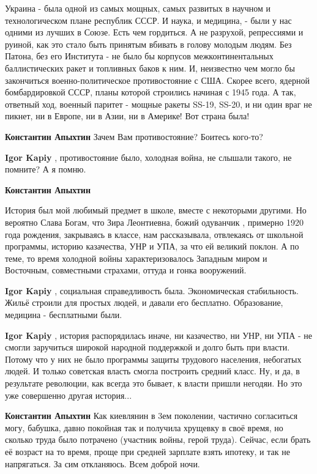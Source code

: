 \begin{itemize}
Украина - была одной из самых мощных, самых развитых в научном и
технологическом плане республик СССР. И наука, и медицина, - были у нас одними
из лучших в Союзе. Есть чем гордиться. А не разрухой, репрессиями и руиной, как
это стало быть принятым вбивать в голову молодым людям. Без Патона, без его
Института - не было бы корпусов межконтинентальных баллистических ракет и
топливных баков к ним. И, неизвестно чем могло бы закончиться
военно-политическое противостояние с США. Скорее всего, ядерной бомбардировкой
СССР, планы которой строились начиная с 1945 года. А так, ответный ход, военный
паритет - мощные ракеты SS-19, SS-20, и ни один враг не пикнет, ни в Европе, ни
в Азии, ни в Америке! Вот страна была!

\begin{itemize} %
\textbf{Константин Апыхтин} Зачем Вам противостояние? Боитесь кого-то?

\begin{itemize} %
\textbf{Igor Kapiy} , противостояние было, холодная война, не слышали такого, не помните? А я помню.

\textbf{Константин Апыхтин} 

История был мой любимый предмет в школе, вместе с некоторыми другими. Но
вероятно Слава Богам, что Зира Леонтиевна, божий одуванчик , примерно 1920 года
рождения, закрываясь в классе, нам рассказывала, отвлекаясь от школьной
программы, историю казачества, УНР и УПА, за что ей великий поклон. А по теме,
то время холодной войны характеризовалось Западным миром и Восточным,
совместными страхами, оттуда и гонка вооружений.

\textbf{Igor Kapiy} , социальная справедливость была. Экономическая стабильность. Жильё строили для простых людей, и давали его бесплатно. Образование, медицина - бесплатными были.

\textbf{Igor Kapiy} , история распорядилась иначе, ни казачество, ни УНР, ни УПА - не смогли заручиться широкой народной поддержкой и долго быть при власти. Потому что у них не было программы защиты трудового населения, небогатых людей. И только советская власть смогла построить средний класс. Ну, и да, в результате революции, как всегда это бывает, к власти пришли негодяи. Но это уже совершенно другая история...

\textbf{Константин Апыхтин} Как киевлянин в 3ем поколении, частично согласиться могу, бабушка, давно покойная так и получила хрущевку в своё время, но сколько труда было потрачено (участник войны, герой труда). Сейчас, если брать её возраст на то время, проще при средней зарплате взять ипотеку, и так не напрягаться.
За сим откланяюсь. Всем доброй ночи.


\end{itemize}
\end{itemize}
\end{itemize}

